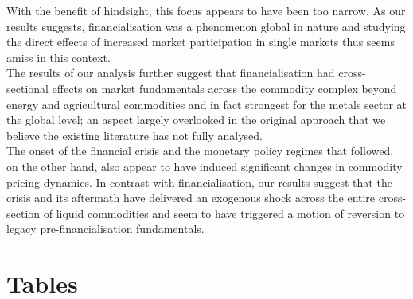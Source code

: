 \documentclass[]{elsarticle} %
\begin{document}
\medskip\setlength{\parindent}{0pt}

With the benefit of hindsight, this focus appears to have been too narrow. As our results suggests, financialisation was a phenomenon global in nature and studying the direct effects of increased market participation in single markets thus seems amiss in this context.\\
The results of our analysis further suggest that financialisation had cross-sectional effects on market fundamentals across the commodity complex beyond energy and agricultural commodities and in fact strongest for the metals sector at the global level; an aspect largely overlooked in the original approach that we believe the existing literature has not fully analysed.\\
The onset of the financial crisis and the monetary policy regimes that followed, on the other hand, also appear to have induced significant changes in commodity pricing dynamics. In contrast with financialisation, our results suggest that the crisis and its aftermath have delivered an exogenous shock across the entire cross-section of liquid commodities and seem to have triggered a motion of reversion to legacy pre-financialisation fundamentals.

\newpage{}

\hypertarget{tables}{%
\section{Tables}\label{tables}}

\begingroup\fontsize{9}{11}\selectfont
\end{document}
